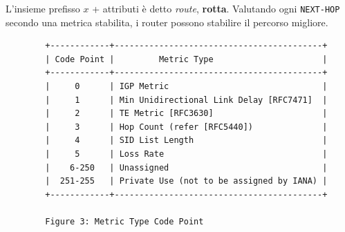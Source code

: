 L'insieme prefisso $x$ + attributi è detto \textit{route}, \textbf{rotta}. Valutando ogni \verb|NEXT-HOP| secondo una metrica stabilita, i router possono stabilire il percorso migliore.

\begin{footnotesize}
	\begin{verbatim}
		+------------+------------------------------------------+
		| Code Point |         Metric Type                      |
		+------------+------------------------------------------+
		|     0      | IGP Metric                               |
		|     1      | Min Unidirectional Link Delay [RFC7471]  |
		|     2      | TE Metric [RFC3630]                      |
		|     3      | Hop Count (refer [RFC5440])              |
		|     4      | SID List Length                          |
		|     5      | Loss Rate                                |
		|    6-250   | Unassigned                               |
		|  251-255   | Private Use (not to be assigned by IANA) |
		+------------+------------------------------------------+
		
		Figure 3: Metric Type Code Point  
	\end{verbatim}
\end{footnotesize}
